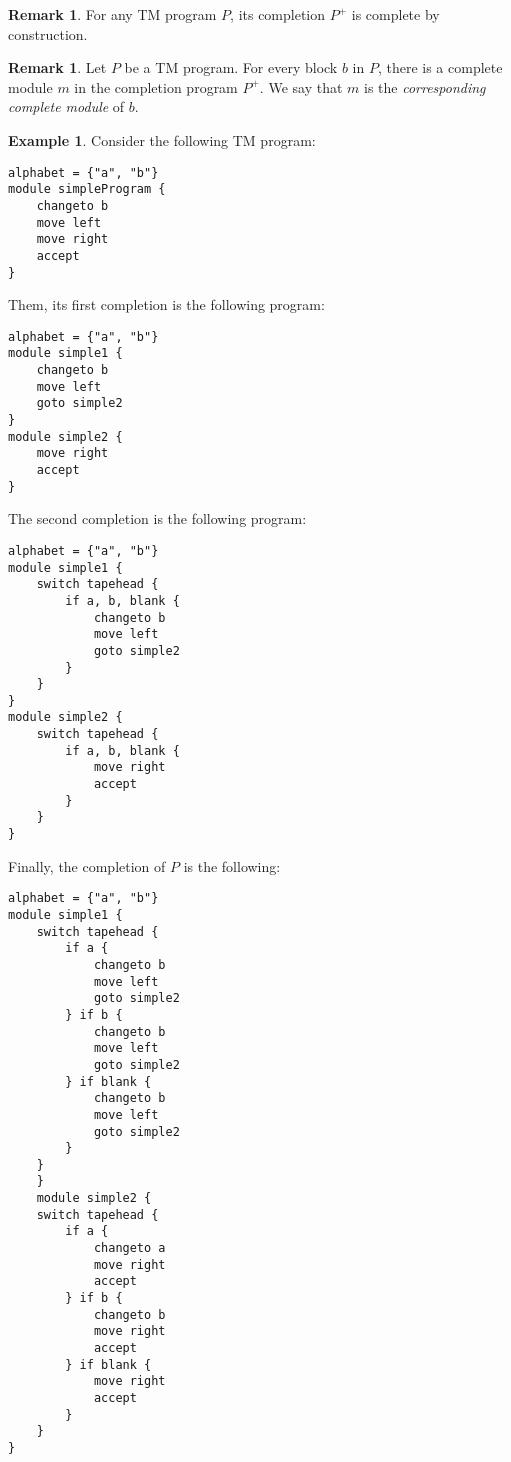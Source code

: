 \documentclass{article}
\theoremstyle{definition}
\newtheorem{remark}[rules]{Remark}
\newtheorem{example}[rules]{Example}
\theoremstyle{plain}
\begin{document}
\begin{remark}
    For any TM program $P$, its completion $P^+$ is complete by construction.
\end{remark}

\begin{remark}
    Let $P$ be a TM program. For every block $b$ in $P$, there is a complete module $m$ in the completion program $P^+$. We say that $m$ is the \emph{corresponding complete module} of $b$.
\end{remark}

\begin{example}
    Consider the following TM program:
\begin{lstlisting}[language=TML]
alphabet = {"a", "b"}
module simpleProgram {
    changeto b
    move left
    move right
    accept
}
\end{lstlisting}
\noindent Them, its first completion is the following program:
\begin{lstlisting}[language=TML]
alphabet = {"a", "b"}
module simple1 {
    changeto b
    move left
    goto simple2
}
module simple2 {
    move right
    accept
}
\end{lstlisting}
\noindent The second completion is the following program:
\begin{lstlisting}[language=TML]
alphabet = {"a", "b"}
module simple1 {
    switch tapehead {
        if a, b, blank {
            changeto b
            move left
            goto simple2
        }
    }
}
module simple2 {
    switch tapehead {
        if a, b, blank {
            move right
            accept
        }
    }
}
\end{lstlisting}
\noindent Finally, the completion of $P$ is the following:
\begin{lstlisting}[language=TML]
alphabet = {"a", "b"}
module simple1 {
    switch tapehead {
        if a {
            changeto b
            move left
            goto simple2
        } if b {
            changeto b
            move left
            goto simple2
        } if blank {
            changeto b
            move left
            goto simple2
        }
    }
    }
    module simple2 {
    switch tapehead {
        if a {
            changeto a
            move right
            accept
        } if b {
            changeto b
            move right
            accept
        } if blank {
            move right
            accept
        }
    }
}
\end{lstlisting}
\end{example}
\end{document}
